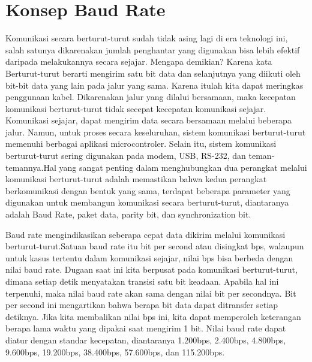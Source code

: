 
\section{Konsep Baud Rate}
Komunikasi secara berturut-turut sudah tidak asing lagi di era teknologi ini, salah satunya dikarenakan jumlah penghantar yang digunakan bisa lebih efektif daripada melakukannya secara sejajar. Mengapa demikian? Karena kata Berturut-turut berarti mengirim satu bit data dan selanjutnya yang diikuti oleh bit-bit data yang lain pada jalur yang sama. Karena itulah kita dapat meringkas penggunaan kabel. Dikarenakan jalur yang dilalui bersamaan, maka kecepatan komunikasi berturut-turut tidak secepat kecepatan komunikasi sejajar. Komunikasi sejajar, dapat mengirim data secara bersamaan melalui beberapa jalur. Namun, untuk proses secara keseluruhan, sistem komunikasi berturut-turut memenuhi berbagai aplikasi microcontroler. Selain itu, sistem komunikasi berturut-turut sering digunakan pada modem, USB, RS-232, dan teman-temannya.Hal yang sangat penting dalam menghubungkan dua perangkat melalui komunikasi berturut-turut adalah memastikan bahwa kedua perangkat berkomunikasi dengan bentuk yang sama, terdapat beberapa parameter yang digunakan untuk membangun komunikasi secara berturut-turut, diantaranya adalah Baud Rate, paket data, parity bit, dan synchronization bit.

Baud rate mengindikasikan seberapa cepat data dikirim melalui komunikasi berturut-turut.Satuan baud rate itu bit per second atau disingkat bps, walaupun untuk kasus tertentu dalam komunikasi sejajar, nilai bps bisa berbeda dengan nilai baud rate. Dugaan saat ini kita berpusat pada komunikasi berturut-turut, dimana setiap detik menyatakan transisi satu bit keadaan. Apabila hal ini terpenuhi, maka nilai baud rate akan sama dengan nilai bit per secondnya. Bit per second ini mengartikan bahwa berapa bit data dapat ditransfer setiap detiknya. Jika kita membalikan nilai bps ini, kita dapat memperoleh keterangan berapa lama waktu yang dipakai saat mengirim 1 bit. Nilai baud rate dapat diatur dengan standar kecepatan, diantaranya 1.200bps, 2.400bps, 4.800bps, 9.600bps, 19.200bps, 38.400bps, 57.600bps, dan 115.200bps.

